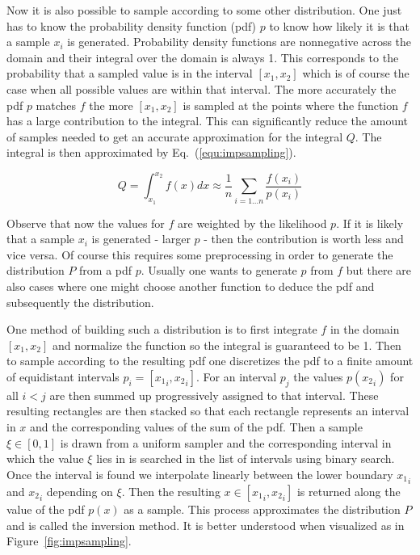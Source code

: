 \documentclass[a4paper,10pt]{article}
\newcommand{\equref}[1]{Eq.~(\ref{#1})}
\newcommand{\figref}[1]{Figure~\ref{#1}}
\begin{document}
    Now it is also possible to sample according to some other distribution.
    One just has to know the probability density function (pdf) $p$ to know
    how likely it is that a sample $x_i$ is generated.
    Probability density functions are nonnegative across the domain
    and their integral over the domain is always 1.
    This corresponds to the probability that a sampled value is in the
    interval $[x_1, x_2]$ which is of course the case when all
    possible values are within that interval. 
    The more accurately the pdf $p$ matches $f$ the more $[x_1,x_2]$
    is sampled at the points where the function $f$ has a large contribution to
    the integral.
    This can significantly reduce the amount of samples needed to get an
    accurate approximation for the integral $Q$.
    The integral is then approximated by \equref{equ:impsampling}.

    \begin{equation}
        \label{equ:impsampling}
        Q = \int_{x_1}^{x_2} f(x) dx \approx \frac{1}{n} \sum_{i = 1...n} \frac{f(x_i)}{p(x_i)}
    \end{equation}

    Observe that now the values for $f$ are weighted by the likelihood $p$.
    If it is likely that a sample $x_i$ is generated - larger $p$ - then
    the contribution is worth less and vice versa.     
    Of course this requires some preprocessing in order to generate the
    distribution $P$ from a pdf $p$.
    Usually one wants to generate $p$ from $f$ but there are also 
    cases where one might choose another function to deduce the
    pdf and subsequently the distribution.

    One method of building such a distribution is to first integrate
    $f$ in the domain $[x_1, x_2]$ and normalize the function so the
    integral is guaranteed to be 1.
    Then to sample according to the resulting pdf one discretizes the
    pdf to a finite amount of equidistant intervals $p_i = [{x_1}_i, {x_2}_i]$.
    For an interval $p_j$ the values $p({x_2}_i)$ for all $i < j$ are
    then summed up progressively assigned to that interval.
    These resulting rectangles are then stacked so that each rectangle
    represents an interval in $x$ and the corresponding values of the
    sum of the pdf.
    Then a sample $\xi \in [0,1]$ is drawn from a uniform sampler and
    the corresponding interval in which the value $\xi$ lies in is
    searched in the list of intervals using binary search.
    Once the interval is found we interpolate linearly between the
    lower boundary ${x_1}_i$ and ${x_2}_i$ depending on $\xi$.
    Then the resulting $x \in [{x_1}_i, {x_2}_i]$ is returned along
    the value of the pdf $p(x)$ as a sample.
    This process approximates the distribution $P$ and is called the
    inversion method. It is better understood when visualized as in
    \figref{fig:impsampling}. 
    
\end{document}
